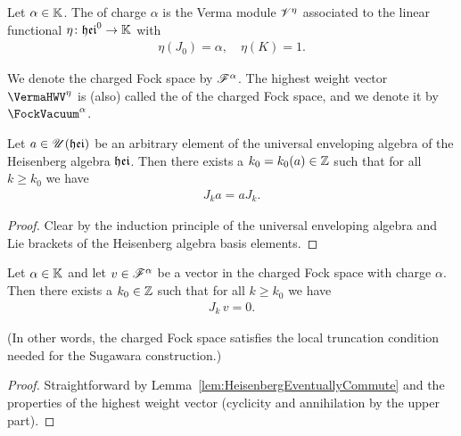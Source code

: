 \begin{definition}
  \label{def:ChargedFockSpace}
  \leanok
  Let $\alpha \in \mathbb{K}$.
  The  of charge $\alpha$
  is the Verma module $\mathscr{V}^{\eta}$ associated to the linear functional
  $\eta \colon \mathfrak{hei}^0 \to \mathbb{K}$ with
  \begin{align*}
    \eta(J_0) = \alpha, \quad \eta(K) = 1 .
  \end{align*}

  We denote the charged Fock space by $\mathscr{F}^{\alpha}$.
  The highest weight vector $\VermaHWV^{\eta}$
  is (also) called the  of the charged Fock space,
  and we denote it by $\FockVacuum^{\alpha}$.
\end{definition}

\begin{lemma}
  \label{lem:HeisenbergEventuallyCommute}
  \leanok
  Let $a \in \mathscr{U}(\mathfrak{hei})$ be an arbitrary element of the universal enveloping
  algebra of the Heisenberg algebra $\mathfrak{hei}$. Then there exists a $k_0=k_0(a) \in \mathbb{Z}$
  such that for all $k \ge k_0$ we have
  \begin{align*}
    J_k a = a J_k .
  \end{align*}
\end{lemma}
\begin{proof}
  \leanok
  Clear by the induction principle of the universal enveloping algebra and
  Lie brackets of the Heisenberg algebra basis elements.
\end{proof}

\begin{lemma}
  \label{lem:TruncationForChargedFockSpace}
  \leanok
  Let $\alpha \in \mathbb{K}$ and let $v \in \mathscr{F}^{\alpha}$ be a vector in
  the charged Fock space with charge $\alpha$.
  Then there exists a $k_0 \in \mathbb{Z}$ such that for all $k \ge k_0$ we have
  \begin{align*}
    J_k \, v = 0 .
  \end{align*}

  (In other words, the charged Fock space satisfies the local truncation condition
  \tagHeiTrunc{} needed for the Sugawara construction.)
\end{lemma}
\begin{proof}
  \leanok
  Straightforward by Lemma~\ref{lem:HeisenbergEventuallyCommute}
  and the properties of the highest weight vector
  (cyclicity and annihilation by the upper part).
\end{proof}

